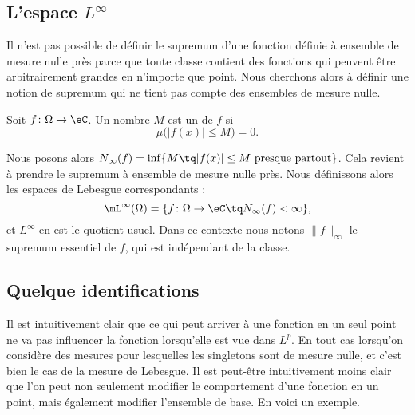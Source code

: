 \subsection{L'espace \texorpdfstring{$ L^{\infty}$}{Linfinity}}

Il n'est pas possible de définir le supremum d'une fonction définie à ensemble de mesure nulle près parce que toute classe contient des fonctions qui peuvent être arbitrairement grandes en n'importe que point. Nous cherchons alors à définir une notion de supremum qui ne tient pas compte des ensembles de mesure nulle.
\begin{definition}
    Soit \( f\colon \Omega\to \eC\). Un nombre \( M\) est un  de \( f\) si
    \begin{equation}
        \mu\big( | f(x) |\leq M \big)=0.
    \end{equation}
\end{definition}
Nous posons alors \( N_{\infty}(f)=\inf\{ M\tq | f(x) |\leq M\text{ presque partout} \}\). Cela revient à prendre le supremum à ensemble de mesure nulle près. Nous définissons alors les espaces de Lebesgue correspondants :
\begin{equation}
    \mL^{\infty}(\Omega)=\{ f\colon \Omega\to \eC\tq N_{\infty}(f)<\infty \},
\end{equation}
et \( L^{\infty}\) en est le quotient usuel. Dans ce contexte nous notons \( \| f \|_{\infty}\) le supremum essentiel de \( f\), qui est indépendant de la classe.

\subsection{Quelque identifications}

Il est intuitivement clair que ce qui peut arriver à une fonction en un seul point ne va pas influencer la fonction lorsqu'elle est vue dans \( L^p\). En tout cas lorsqu'on considère des mesures pour lesquelles les singletons sont de mesure nulle, et c'est bien le cas de la mesure de Lebesgue. Il est peut-être intuitivement moins clair que l'on peut non seulement modifier le comportement d'une fonction en un point, mais également modifier l'ensemble de base. En voici un exemple.

